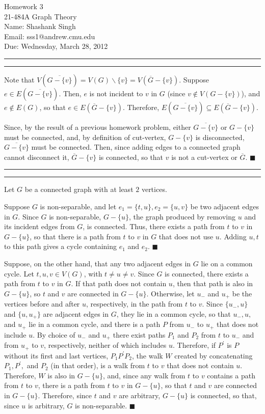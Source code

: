 \documentclass[11pt]{article}
\makeatletter
\newcounter{questionCounter}
\newcounter{partCounter}[questionCounter]
\newenvironment{question}[2][\arabic{questionCounter}]{%
    \setcounter{partCounter}{0}%
    \vspace{.25in} \hrule \vspace{0.5em}%
        \noindent{\bf #2}%
    \vspace{0.8em} \hrule \vspace{.10in}%
    \addtocounter{questionCounter}{1}%
}{}
\newcommand{\myname}{Shashank Singh}
\newcommand{\myandrew}{sss1@andrew.cmu.edu}
\newcommand{\myclass}{21-484A Graph Theory}
\newcommand{\myhwnum}{3}
\newcommand{\duedate}{Wednesday, March 28, 2012}
\makeatother
\begin{document}
\thispagestyle{plain}

{\Large Homework \myhwnum} \\
\myclass \\
Name: \myname \\
Email: \myandrew \\
Due: \duedate
\begin{question}{Problem 2}
Note that
$V(\overline{G - \{v\}}) = V(G) \backslash \{v\} = V(\overline{G} - \{v\})$.
Suppose $e \in E(\overline{G - \{v\}})$. Then, $e$ is not incident to $v$ in
$G$ (since $v \not \in V(G - \{v\})$), and $e \not \in E(G)$, so that
$e \in E(\overline{G} - \{v\})$. Therefore,
$E(\overline{G - \{v\}}) \subseteq E(\overline{G} - \{v\})$.

Since, by the result of a previous homework problem, either
$\overline{G - \{v\}}$ or $G - \{v\}$ must be connected, and, by definition of
cut-vertex, $G - \{v\}$ is disconnected, $\overline{G - \{v\}}$ must be
connected. Then, since adding edges to a connected graph cannot disconnect it,
$\overline{G} - \{v\}$ is connected, so that $v$ is not a cut-vertex or
$\overline{G}$. \quad $\blacksquare$
\end{question}

\begin{question}{Problem 3}
Let $G$ be a connected graph with at least $2$ vertices.

Suppose $G$ is non-separable, and let $e_1 = \{t,u\},e_2 = \{u,v\}$ be two
adjacent edges in $G$. Since $G$ is non-separable, $G - \{u\}$, the graph
produced by removing $u$ and its incident edges from $G$, is connected. Thus,
there exists a path from $t$ to $v$ in $G - \{u\}$, so that there is a path
from $t$ to $v$ in $G$ that does not use $u$. Adding $u,t$ to this path gives
a cycle containing $e_1$ and $e_2$. \quad $\blacksquare$

Suppose, on the other hand, that any two adjacent edges in $G$ lie on a common
cycle. Let $t,u,v \in V(G)$, with $t \neq u \neq v$. Since $G$ is connected,
there exists a path from $t$ to $v$ in $G$. If that path does not contain $u$,
then that path is also in $G - \{u\}$, so $t$ and $v$ are connected in
$G - \{u\}$. Otherwise, let $u_-$ and $u_+$ be the vertices before and after
$u$, respectively, in the path from $t$ to $v$. Since $\{u_-,u\}$ and
$\{u,u_+\}$ are adjacent edges in $G$, they lie in a common cycle, so that
$u_-,u,$ and $u_+$ lie in a common cycle, and there is a path $P$ from $u_-$
to $u_+$ that does not include $u$. By choice of $u_-$ and $u_+$ there exist
paths $P_1$ and $P_2$ from $t$ to $u_-$ and from $u_+$ to $v$, respectively,
neither of which includes $u$. Therefore, if $P^{\prime}$ is $P$ without its
first and last vertices, $P_1P^{\prime}P_2$, the walk $W$ created by
concatenating $P_1,P^{\prime},$ and $P_2$ (in that order), is a walk from $t$
to $v$ that does not contain $u$. Therefore, $W$ is also in $G - \{u\}$, and,
since any walk from $t$ to $v$ contains a path from $t$ to $v$, there is a
path from $t$ to $v$ in $G - \{u\}$, so that $t$ and $v$ are connected in
$G - \{u\}$. Therefore, since $t$ and $v$ are arbitrary, $G - \{u\}$ is
connected, so that, since $u$ is arbitrary, $G$ is non-separable.
\quad $\blacksquare$
\end{question}
\end{document}
